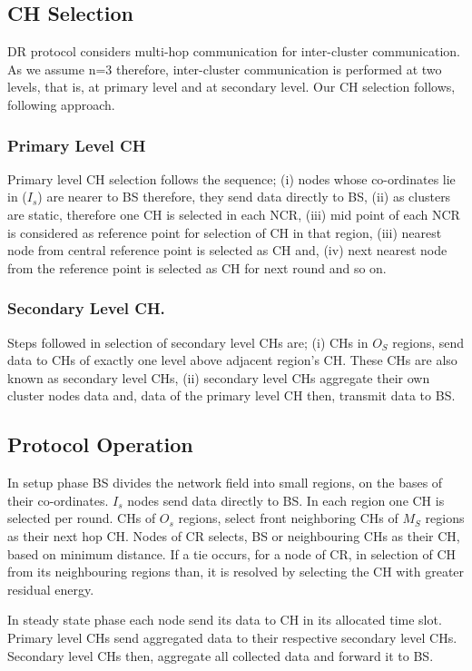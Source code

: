 \documentclass[3p,times,procedia]{elsarticle}
\begin{document}
\subsection{CH Selection}
DR protocol considers multi-hop communication for inter-cluster communication. As we assume n=3 therefore, inter-cluster communication is performed at two levels, that is, at primary level and at secondary level. Our CH selection follows, following approach.

\subsubsection{Primary Level CH}
Primary level CH selection follows the sequence; (i) nodes whose co-ordinates lie in ($I_s$) are nearer to BS therefore, they send data directly to BS, (ii) as clusters are static, therefore one CH is selected in each NCR, (iii) mid point of each NCR is considered as reference point for selection of CH in that region, (iii) nearest node from central reference point is selected as CH and, (iv) next nearest node from the reference point is selected as CH for next round and so on.

\subsubsection{Secondary Level CH.}
Steps followed in selection of secondary level CHs are; (i) CHs in $O_S$ regions, send data to CHs of exactly one level above adjacent region's CH. These CHs are also known as secondary level CHs, (ii) secondary level CHs aggregate their own cluster nodes data and, data of the primary level CH then, transmit data to BS.
\subsection{Protocol Operation}

In setup phase BS divides the network field into small regions, on the bases of their co-ordinates. $I_s$ nodes send data directly to BS. In each region one CH is selected per round. CHs of $O_s$ regions, select front neighboring CHs of $M_S$ regions as their next hop CH. Nodes of CR selects, BS or neighbouring CHs as their CH, based on minimum distance. If a tie occurs, for a node of CR, in selection of CH from its neighbouring regions than, it is resolved by selecting the CH with greater residual energy.

In steady state phase each node send its data to CH in its allocated time slot. Primary level CHs send aggregated data to their respective secondary level CHs. Secondary level CHs then, aggregate all collected data and forward it to BS.
\end{document}
